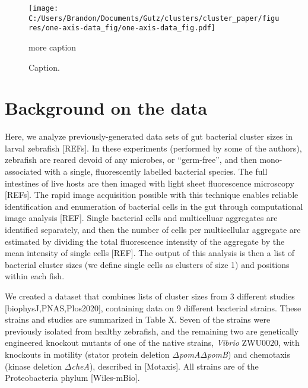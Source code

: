 \documentclass[aps,pre,twocolumn]{revtex4-1}
\begin{document}
\begin{figure}%
	\centerline{
		\texttt{[image: C:/Users/Brandon/Documents/Gutz/clusters/cluster\_paper/figures/one-axis-data\_fig/one-axis-data\_fig.pdf]}}
	\caption{Caption.}{more caption}
	\label{fig:one-axis-data-fig}
\end{figure}



\section{Background on the data}
Here, we analyze previously-generated data sets of gut bacterial cluster sizes in larval zebrafish [REFs]. In these experiments (performed by some of the authors), zebrafish are reared devoid of any microbes, or “germ-free”, and then mono-associated with a single, fluorescently labelled bacterial species. The full intestines of live hosts are then imaged with light sheet fluorescence microscopy [REFs]. The rapid image acquisition possible with this technique enables reliable identification and enumeration of bacterial cells in the gut through computational image analysis [REF]. Single bacterial cells and multicelluar aggregates are identified separately, and then the number of cells per multicellular aggregate are estimated by dividing the total fluorescence intensity of the aggregate by the mean intensity of single cells [REF]. The output of this analysis is then a list of bacterial cluster sizes (we define single cells as clusters of size 1) and positions within each fish. 



We created a dataset that combines lists of cluster sizes from 3 different studies [biophysJ,PNAS,Plos2020], containing data on 9 different bacterial strains. These strains and studies are summarized in Table X. Seven of the strains were previously isolated from healthy zebrafish, and the remaining two are genetically engineered knockout mutants of one of the native strains, \textit{Vibrio} ZWU0020, with knockouts in motility (stator protein deletion $\Delta$\textit{pomA}$\Delta$\textit{pomB}) and chemotaxis (kinase deletion $\Delta$\textit{cheA}), described in [Motaxis]. All strains are of the Proteobacteria phylum [Wiles-mBio].
\end{document}
